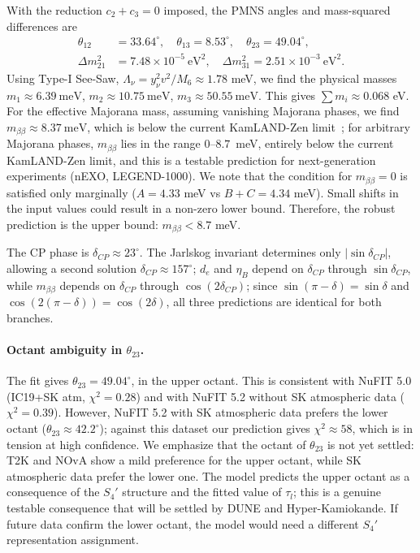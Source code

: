 \documentclass[12pt,a4paper]{article}
\numberwithin{equation}{section}
\begin{document}
With the reduction \(c_2 + c_3 = 0\) imposed, the PMNS angles and mass-squared differences are
\begin{align}
\theta_{12} &= 33.64^\circ, \quad \theta_{13} = 8.53^\circ, \quad \theta_{23} = 49.04^\circ, \\
\Delta m^2_{21} &= 7.48 \times 10^{-5}~\text{eV}^2, \quad \Delta m^2_{31} = 2.51 \times 10^{-3}~\text{eV}^2.
\end{align}
Using Type-I See-Saw, \(\Lambda_\nu = y_\nu^2 v^2 / M_6 \approx 1.78\) meV, we find the physical masses \(m_1 \approx 6.39~\text{meV}\), \(m_2 \approx 10.75~\text{meV}\), \(m_3 \approx 50.55~\text{meV}\). This gives \(\sum m_i \approx 0.068\) eV. For the effective Majorana mass, assuming vanishing Majorana phases, we find \(m_{\beta\beta} \approx 8.37~\text{meV}\), which is below the current KamLAND-Zen limit~\cite{KamLANDZen2023}; for arbitrary Majorana phases, \(m_{\beta\beta}\) lies in the range \(0\)--\(8.7\)~meV, entirely below the current KamLAND-Zen limit, and this is a testable prediction for next-generation experiments (nEXO, LEGEND-1000).
We note that the condition for \(m_{\beta\beta} = 0\) is satisfied only marginally (\(A = 4.33\) meV vs \(B+C = 4.34\) meV). Small shifts in the input values could result in a non-zero lower bound. Therefore, the robust prediction is the upper bound: \(m_{\beta\beta} < 8.7\) meV.

The CP phase is \(\delta_{CP} \approx 23^\circ\). The Jarlskog invariant determines only \(|\sin\delta_{CP}|\), allowing a second solution \(\delta_{CP} \approx 157^\circ\); \(d_e\) and \(\eta_B\) depend on \(\delta_{CP}\) through \(\sin\delta_{CP}\), while \(m_{\beta\beta}\) depends on \(\delta_{CP}\) through \(\cos(2\delta_{CP})\); since \(\sin(\pi-\delta) = \sin\delta\) and \(\cos(2(\pi-\delta)) = \cos(2\delta)\), all three predictions are identical for both branches.

\paragraph{Octant ambiguity in \(\theta_{23}\).}
The fit gives \(\theta_{23} = 49.04^\circ\), in the upper octant. This is consistent with NuFIT 5.0 (IC19+SK atm, \(\chi^2 = 0.28\)) and with NuFIT 5.2 without SK atmospheric data (\(\chi^2 = 0.39\)). However, NuFIT 5.2 with SK atmospheric data prefers the lower octant (\(\theta_{23} \approx 42.2^\circ\)); against this dataset our prediction gives \(\chi^2 \approx 58\), which is in tension at high confidence. We emphasize that the octant of \(\theta_{23}\) is not yet settled: T2K and NOvA show a mild preference for the upper octant, while SK atmospheric data prefer the lower one. The model predicts the upper octant as a consequence of the \(S_4'\) structure and the fitted value of \(\tau_l\); this is a genuine testable consequence that will be settled by DUNE and Hyper-Kamiokande. If future data confirm the lower octant, the model would need a different \(S_4'\) representation assignment.
\end{document}
